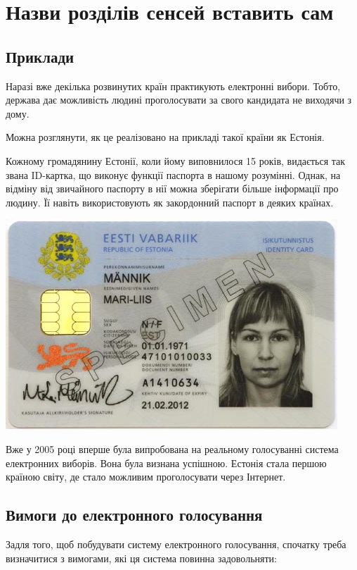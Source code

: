 \documentclass[12pt]{report}
\theoremstyle{plain}
\theoremstyle{definition}
\theoremstyle{remark}
\begin{document}
\chapter{Назви розділів сенсей вставить сам}

%

\section{Приклади}

Наразі вже декілька розвинутих країн практикують електронні вибори. Тобто, держава дає можливість
людині проголосувати за свого кандидата не виходячи з дому.

Можна розглянути, як це реалізовано на прикладі такої країни як Естонія.

Кожному громадянину Естонії, коли йому виповнилося 15 років, видається так звана ID-картка, що виконує
функції паспорта в нашому розумінні. Однак, на відміну від звичайного паспорту в нії можна зберігати
більше інформації про людину. Її навіть використовують як закордонний паспорт в деяких країнах.

\includegraphics{idcard}

Вже у 2005 році вперше була випробована на реальному голосуванні система електронних виборів.
Вона була визнана успішною. 
Естонія стала першою країною світу, де стало можливим проголосувати через Інтернет. 

\section{Вимоги до електронного голосування}
Задля того, щоб побудувати систему електронного голосування, спочатку треба визначитися з вимогами, які
ця система повинна задовольняти:
\end{document}
